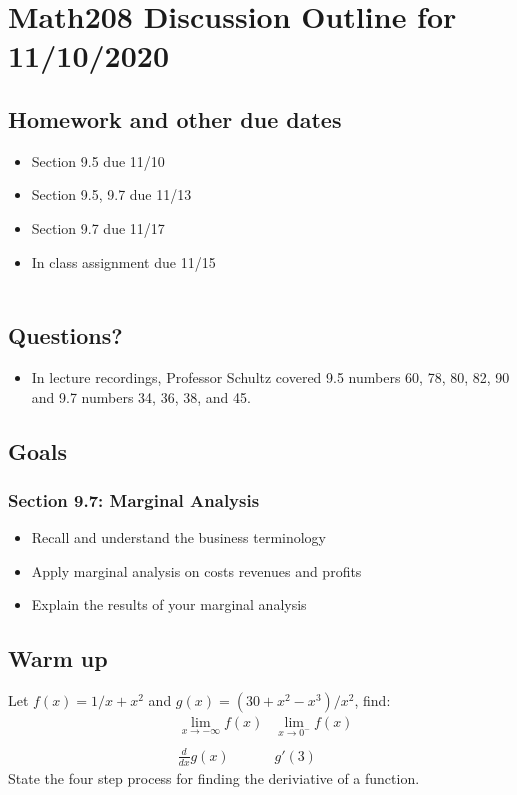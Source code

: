 \documentclass[14pt]{extarticle}
\begin{document}
\section*{Math208 Discussion Outline for 11/10/2020}

\subsection{Homework and other due dates}
\begin{itemize}
\item Section 9.5 due 11/10
\item Section 9.5, 9.7 due 11/13
\item Section 9.7 due 11/17
\item In class assignment due 11/15 \\\\
\end{itemize}

\subsection{Questions?}
\begin{itemize}
	\item In lecture recordings, Professor Schultz covered 9.5 numbers 60, 78, 80, 82, 90 and 9.7 numbers 34, 36, 38, and 45.
\end{itemize}

\subsection{Goals}
\subsubsection*{Section 9.7: Marginal Analysis}
\begin{itemize}
	\item Recall and understand the business terminology
	\item Apply marginal analysis on costs revenues and profits
	\item Explain the results of your marginal analysis
\end{itemize}

\subsection{Warm up} Let $f(x) = 1/x  + x^2$ and $g(x)= (30 + x^2 - x^3)/x^2$, find:
\begin{align*}
	&\lim_{x \to -\infty}f(x)	&\lim_{x \to 0^-}f(x) \\\\
	&\frac{d}{dx}g(x)			&g'(3) 
\end{align*}
State the four step process for finding the deriviative of a function.
\end{document}
